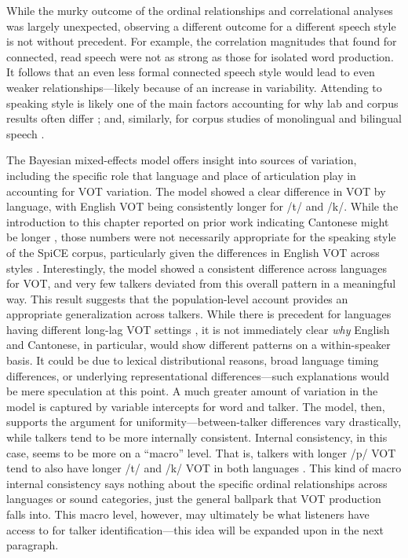 While the murky outcome of the ordinal relationships and correlational analyses was largely unexpected, observing a different outcome for a different speech style is not without precedent. For example, the correlation magnitudes that \citet{chodroff_2017_structure} found for connected, read speech were not as strong as those for isolated word production. It follows that an even less formal connected speech style would lead to even weaker relationships---likely because of an increase in variability. Attending to speaking style is likely one of the main factors accounting for why lab and corpus results often differ \citep{gahl_2012_reduce,chodroff_2017_structure}; and, similarly, for corpus studies of monolingual and bilingual speech \citep{johnson_2019_probabilistic}. 

The Bayesian mixed-effects model offers insight into sources of variation, including the specific role that language and place of articulation play in accounting for VOT variation. The model showed a clear difference in VOT by language, with English VOT being consistently longer for /t/ and /k/. While the introduction to this chapter reported on prior work indicating Cantonese might be longer \citep{clumeck_1981_cantonese, lisker_1964_vot}, those numbers were not necessarily appropriate for the speaking style of the SpiCE corpus, particularly given the differences in English VOT across styles \citep{stuartsmith_2015_private}. Interestingly, the model showed a consistent difference across languages for VOT, and very few talkers deviated from this overall pattern in a meaningful way. This result suggests that the population-level account provides an appropriate generalization across talkers. While there is precedent for languages having different long-lag VOT settings \citep{chodroff_2019_covariation}, it is not immediately clear \textit{why} English and Cantonese, in particular, would show different patterns on a within-speaker basis. It could be due to lexical distributional reasons, broad language timing differences, or underlying representational differences---such explanations would be mere speculation at this point. A much greater amount of variation in the model is captured by variable intercepts for word and talker. The model, then, supports the argument for uniformity---between-talker differences vary drastically, while talkers tend to be more internally consistent. Internal consistency, in this case, seems to be more on a ``macro'' level. That is, talkers with longer /p/ VOT tend to also have longer /t/ and /k/ VOT in both languages \citep[as with speech rate in][]{bradlow_2017_rate}. This kind of macro internal consistency says nothing about the specific ordinal relationships across languages or sound categories, just the general ballpark that VOT production falls into. This macro level, however, may ultimately be what listeners have access to for talker identification---this idea will be expanded upon in the next paragraph. 

